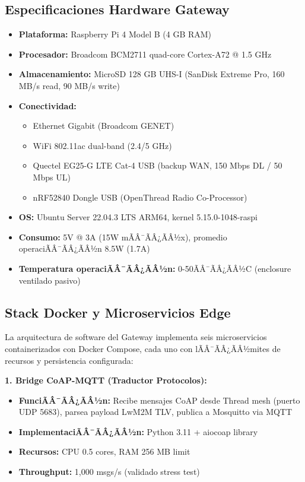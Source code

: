 \subsection{Especificaciones Hardware Gateway}\n\label{sec:impl-gateway-hw}\n\n\begin{itemize}\n    \item \textbf{Plataforma:} Raspberry Pi 4 Model B (4 GB RAM)\n    \item \textbf{Procesador:} Broadcom BCM2711 quad-core Cortex-A72 @ 1.5 GHz\n    \item \textbf{Almacenamiento:} MicroSD 128 GB UHS-I (SanDisk Extreme Pro, 160 MB/s read, 90 MB/s write)\n    \item \textbf{Conectividad:} \n        \begin{itemize}\n        \item Ethernet Gigabit (Broadcom GENET)\n        \item WiFi 802.11ac dual-band (2.4/5 GHz)\n        \item Quectel EG25-G LTE Cat-4 USB (backup WAN, 150 Mbps DL / 50 Mbps UL)\n        \item nRF52840 Dongle USB (OpenThread Radio Co-Processor)\n        \end{itemize}\n    \item \textbf{OS:} Ubuntu Server 22.04.3 LTS ARM64, kernel 5.15.0-1048-raspi\n    \item \textbf{Consumo:} 5V @ 3A (15W mÃÂ¯ÃÂ¿ÃÂ½x), promedio operaciÃÂ¯ÃÂ¿ÃÂ½n 8.5W (1.7A)\n    \item \textbf{Temperatura operaciÃÂ¯ÃÂ¿ÃÂ½n:} 0-50ÃÂ¯ÃÂ¿ÃÂ½C (enclosure ventilado pasivo)\n\end{itemize}\n\n\subsection{Stack Docker y Microservicios Edge}\n\label{sec:impl-software-gateway}

La arquitectura de software del Gateway implementa seis microservicios containerizados con Docker Compose, cada uno con lÃÂ¯ÃÂ¿ÃÂ½mites de recursos y persistencia configurada:

\textbf{1. Bridge CoAP-MQTT (Traductor Protocolos):}
\begin{itemize}
    \item \textbf{FunciÃÂ¯ÃÂ¿ÃÂ½n:} Recibe mensajes CoAP desde Thread mesh (puerto UDP 5683), parsea payload LwM2M TLV, publica a Mosquitto via MQTT
    \item \textbf{ImplementaciÃÂ¯ÃÂ¿ÃÂ½n:} Python 3.11 + aiocoap library
    \item \textbf{Recursos:} CPU 0.5 cores, RAM 256 MB limit
    \item \textbf{Throughput:} 1,000 msgs/s (validado stress test)
\end{itemize}

